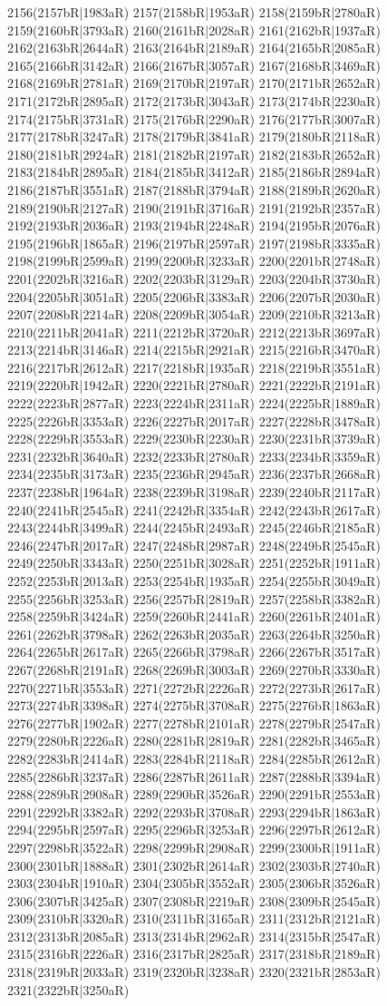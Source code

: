 2156(2157bR|1983aR) 2157(2158bR|1953aR) 2158(2159bR|2780aR) 2159(2160bR|3793aR) 2160(2161bR|2028aR) 2161(2162bR|1937aR) 2162(2163bR|2644aR) 2163(2164bR|2189aR) 2164(2165bR|2085aR) 2165(2166bR|3142aR) 2166(2167bR|3057aR) 2167(2168bR|3469aR) 2168(2169bR|2781aR) 2169(2170bR|2197aR) 2170(2171bR|2652aR) 2171(2172bR|2895aR) 2172(2173bR|3043aR) 2173(2174bR|2230aR) 2174(2175bR|3731aR) 2175(2176bR|2290aR) 2176(2177bR|3007aR) 2177(2178bR|3247aR) 2178(2179bR|3841aR) 2179(2180bR|2118aR) 2180(2181bR|2924aR) 2181(2182bR|2197aR) 2182(2183bR|2652aR) 2183(2184bR|2895aR) 2184(2185bR|3412aR) 2185(2186bR|2894aR) 2186(2187bR|3551aR) 2187(2188bR|3794aR) 2188(2189bR|2620aR) 2189(2190bR|2127aR) 2190(2191bR|3716aR) 2191(2192bR|2357aR) 2192(2193bR|2036aR) 2193(2194bR|2248aR) 2194(2195bR|2076aR) 2195(2196bR|1865aR) 2196(2197bR|2597aR) 2197(2198bR|3335aR) 2198(2199bR|2599aR) 2199(2200bR|3233aR) 2200(2201bR|2748aR) 2201(2202bR|3216aR) 2202(2203bR|3129aR) 2203(2204bR|3730aR) 2204(2205bR|3051aR) 2205(2206bR|3383aR) 2206(2207bR|2030aR) 2207(2208bR|2214aR) 2208(2209bR|3054aR) 2209(2210bR|3213aR) 2210(2211bR|2041aR) 2211(2212bR|3720aR) 2212(2213bR|3697aR) 2213(2214bR|3146aR) 2214(2215bR|2921aR) 2215(2216bR|3470aR) 2216(2217bR|2612aR) 2217(2218bR|1935aR) 2218(2219bR|3551aR) 2219(2220bR|1942aR) 2220(2221bR|2780aR) 2221(2222bR|2191aR) 2222(2223bR|2877aR) 2223(2224bR|2311aR) 2224(2225bR|1889aR) 2225(2226bR|3353aR) 2226(2227bR|2017aR) 2227(2228bR|3478aR) 2228(2229bR|3553aR) 2229(2230bR|2230aR) 2230(2231bR|3739aR) 2231(2232bR|3640aR) 2232(2233bR|2780aR) 2233(2234bR|3359aR) 2234(2235bR|3173aR) 2235(2236bR|2945aR) 2236(2237bR|2668aR) 2237(2238bR|1964aR) 2238(2239bR|3198aR) 2239(2240bR|2117aR) 2240(2241bR|2545aR) 2241(2242bR|3354aR) 2242(2243bR|2617aR) 2243(2244bR|3499aR) 2244(2245bR|2493aR) 2245(2246bR|2185aR) 2246(2247bR|2017aR) 2247(2248bR|2987aR) 2248(2249bR|2545aR) 2249(2250bR|3343aR) 2250(2251bR|3028aR) 2251(2252bR|1911aR) 2252(2253bR|2013aR) 2253(2254bR|1935aR) 2254(2255bR|3049aR) 2255(2256bR|3253aR) 2256(2257bR|2819aR) 2257(2258bR|3382aR) 2258(2259bR|3424aR) 2259(2260bR|2441aR) 2260(2261bR|2401aR) 2261(2262bR|3798aR) 2262(2263bR|2035aR) 2263(2264bR|3250aR) 2264(2265bR|2617aR) 2265(2266bR|3798aR) 2266(2267bR|3517aR) 2267(2268bR|2191aR) 2268(2269bR|3003aR) 2269(2270bR|3330aR) 2270(2271bR|3553aR) 2271(2272bR|2226aR) 2272(2273bR|2617aR) 2273(2274bR|3398aR) 2274(2275bR|3708aR) 2275(2276bR|1863aR) 2276(2277bR|1902aR) 2277(2278bR|2101aR) 2278(2279bR|2547aR) 2279(2280bR|2226aR) 2280(2281bR|2819aR) 2281(2282bR|3465aR) 2282(2283bR|2414aR) 2283(2284bR|2118aR) 2284(2285bR|2612aR) 2285(2286bR|3237aR) 2286(2287bR|2611aR) 2287(2288bR|3394aR) 2288(2289bR|2908aR) 2289(2290bR|3526aR) 2290(2291bR|2553aR) 2291(2292bR|3382aR) 2292(2293bR|3708aR) 2293(2294bR|1863aR) 2294(2295bR|2597aR) 2295(2296bR|3253aR) 2296(2297bR|2612aR) 2297(2298bR|3522aR) 2298(2299bR|2908aR) 2299(2300bR|1911aR) 2300(2301bR|1888aR) 2301(2302bR|2614aR) 2302(2303bR|2740aR) 2303(2304bR|1910aR) 2304(2305bR|3552aR) 2305(2306bR|3526aR) 2306(2307bR|3425aR) 2307(2308bR|2219aR) 2308(2309bR|2545aR) 2309(2310bR|3320aR) 2310(2311bR|3165aR) 2311(2312bR|2121aR) 2312(2313bR|2085aR) 2313(2314bR|2962aR) 2314(2315bR|2547aR) 2315(2316bR|2226aR) 2316(2317bR|2825aR) 2317(2318bR|2189aR) 2318(2319bR|2033aR) 2319(2320bR|3238aR) 2320(2321bR|2853aR) 2321(2322bR|3250aR) 